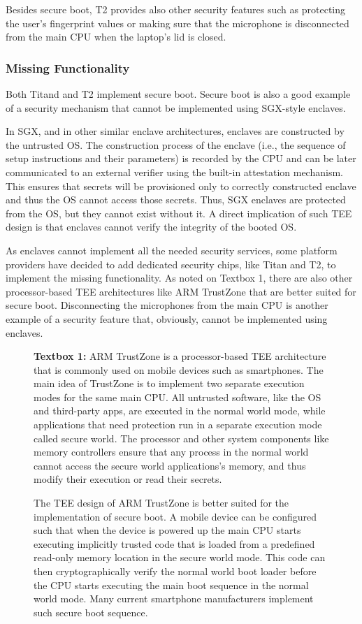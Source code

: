 Besides secure boot, T2 provides also other security features such as protecting the user’s fingerprint values or making sure that the microphone is disconnected from the main CPU when the laptop’s lid is closed. 
 
 
\subsubsection*{Missing Functionality}
  
Both Titand and T2 implement secure boot. Secure boot is also a good example of a security mechanism that cannot be implemented using SGX-style enclaves. 

In SGX, and in other similar enclave architectures, enclaves are constructed by the untrusted OS. The construction process of the enclave (i.e., the sequence of setup instructions and their parameters) is recorded by the CPU and can be later communicated to an external verifier using the built-in attestation mechanism. This ensures that secrets will be provisioned only to correctly constructed enclave and thus the OS cannot access those secrets. Thus, SGX enclaves are protected from the OS, but they cannot exist without it. A direct implication of such TEE design is that enclaves cannot verify the integrity of the booted OS. 

As enclaves cannot implement all the needed security services, some platform providers have decided to add dedicated security chips, like Titan and T2, to implement the missing functionality. As noted on Textbox 1, there are also other processor-based TEE architectures like ARM TrustZone that are better suited for secure boot.
%
Disconnecting the microphones from the main CPU is another example of a security feature that, obviously, cannot be implemented using enclaves.
  

\begin{figure}
	\begin{tcolorbox}
	\textbf{Textbox 1:} 
	ARM TrustZone is a processor-based TEE architecture that is commonly used on mobile devices such as smartphones. The main idea of TrustZone is to implement two separate execution modes for the same main CPU. All untrusted software, like the OS and third-party apps, are executed in the normal world mode, while applications that need protection run in a separate execution mode called secure world. The processor and other system components like memory controllers ensure that any process in the normal world cannot access the secure world applications’s memory, and thus modify their execution or read their secrets.
	
	The TEE design of ARM TrustZone is better suited for the implementation of secure boot. A mobile device can be configured such that when the device is powered up the main CPU starts executing implicitly trusted code that is loaded from a predefined read-only memory location in the secure world mode. This code can then cryptographically verify the normal world boot loader before the CPU starts executing the main boot sequence in the normal world mode. Many current smartphone manufacturers implement such secure boot sequence.
	\end{tcolorbox}
\end{figure}  


